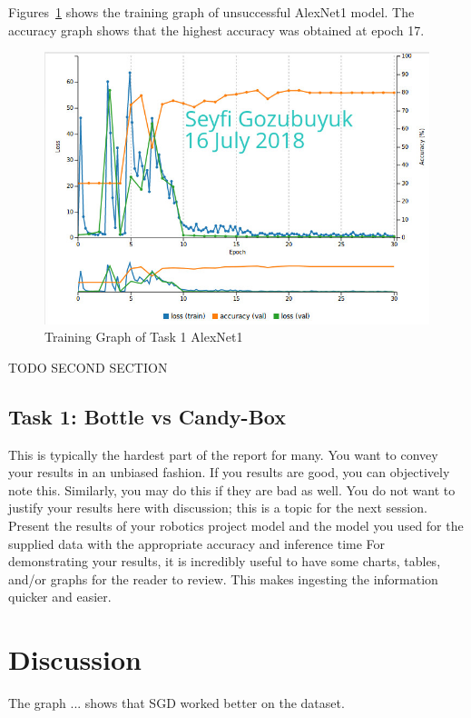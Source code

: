 \documentclass[10pt,journal,compsoc]{IEEEtran}
\begin{document}
Figures~\ref{fig:t1a1g} shows the training graph of unsuccessful AlexNet1 model. The accuracy graph shows that the highest accuracy was obtained at epoch 17.

\begin{figure}[thpb]
      \centering
      \includegraphics[width=\linewidth]{figures/t1a1g.png}
      \caption{Training Graph of Task 1 AlexNet1}
      \label{fig:t1a1g}
\end{figure}


TODO SECOND SECTION
\subsection{Task 1: Bottle vs Candy-Box}

This is typically the hardest part of the report for many. You want to convey your results in an unbiased fashion. If you results are good, you can objectively note this. Similarly, you may do this if they are bad as well. You do not want to justify your results here with discussion; this is a topic for the next session. 
Present the results of your robotics project model and the model you used for the supplied data with the appropriate accuracy and inference time
For demonstrating your results, it is incredibly useful to have some charts, tables, and/or graphs for the reader to review. This makes ingesting the information quicker and easier.

\section{Discussion}
The graph ... shows that SGD worked better on the dataset. 
\end{document}
